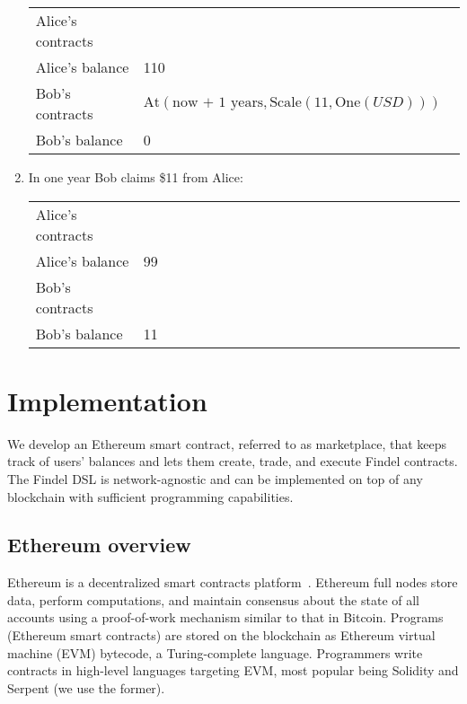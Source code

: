 \begin{enumerate}
	\begin{tabular}{| p{0.25\linewidth} | p{0.75\linewidth} |}
		\hline
		Alice's contracts & \\
		Alice's balance & 110 \\
		Bob's contracts & \(\mathrm{At}(\text{now + 1 years},\mathrm{Scale}(11,\mathrm{One}(USD)))\) \\
		Bob's balance & 0 \\
		\hline    
	\end{tabular}
	
	\item In one year Bob claims \$11 from Alice:
	
	\begin{tabular}{| p{0.25\linewidth} | p{0.75\linewidth} |}
		\hline
		Alice's contracts & \\
		Alice's balance & 99\\
		Bob's contracts & \\
		Bob's balance & 11\\
		\hline    
	\end{tabular}
	
\end{enumerate}




\section{Implementation} \label{sec:Ch10FindelImplementation}

We develop an Ethereum smart contract, referred to as marketplace, that keeps track of users' balances and lets them create, trade, and execute Findel contracts.
The Findel DSL is network-agnostic and can be implemented on top of any blockchain with sufficient programming capabilities.


\subsection{Ethereum overview}

Ethereum is a decentralized smart contracts platform~\cite{Buterin2014, Wood2014}.
Ethereum full nodes store data, perform computations, and maintain consensus about the state of all accounts using a proof-of-work mechanism similar to that in Bitcoin.
Programs (Ethereum smart contracts) are stored on the blockchain as Ethereum virtual machine (EVM) bytecode, a Turing-complete language.
Programmers write contracts in high-level languages targeting EVM, most popular being Solidity and Serpent (we use the former).

